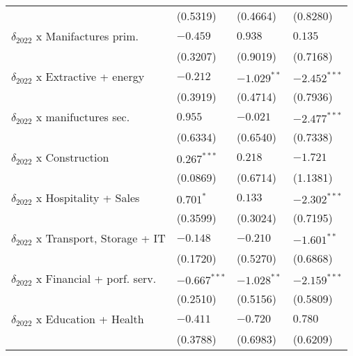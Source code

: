 \begin{tabular}{llll}
                                                   &           (0.5319) &           (0.4664) &           (0.8280) \\
$\delta_{2022}$ x Manifactures prim.               &           $-0.459$ &            $0.938$ &            $0.135$ \\
                                                   &           (0.3207) &           (0.9019) &           (0.7168) \\
$\delta_{2022}$ x Extractive + energy              &           $-0.212$ &      $-1.029^{**}$ &     $-2.452^{***}$ \\
                                                   &           (0.3919) &           (0.4714) &           (0.7936) \\
$\delta_{2022}$ x manifuctures sec.                &            $0.955$ &           $-0.021$ &     $-2.477^{***}$ \\
                                                   &           (0.6334) &           (0.6540) &           (0.7338) \\
$\delta_{2022}$ x Construction                     &      $0.267^{***}$ &            $0.218$ &           $-1.721$ \\
                                                   &           (0.0869) &           (0.6714) &           (1.1381) \\
$\delta_{2022}$ x Hospitality + Sales              &          $0.701^*$ &            $0.133$ &     $-2.302^{***}$ \\
                                                   &           (0.3599) &           (0.3024) &           (0.7195) \\
$\delta_{2022}$ x Transport, Storage + IT          &           $-0.148$ &           $-0.210$ &      $-1.601^{**}$ \\
                                                   &           (0.1720) &           (0.5270) &           (0.6868) \\
$\delta_{2022}$ x Financial + porf. serv.          &     $-0.667^{***}$ &      $-1.028^{**}$ &     $-2.159^{***}$ \\
                                                   &           (0.2510) &           (0.5156) &           (0.5809) \\
$\delta_{2022}$ x Education + Health               &           $-0.411$ &           $-0.720$ &            $0.780$ \\
                                                   &           (0.3788) &           (0.6983) &           (0.6209) \\

\end{tabular}
